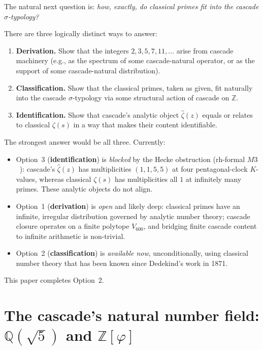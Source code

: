 \documentclass[11pt,a4paper]{article}
\theoremstyle{definition}
\theoremstyle{remark}
\begin{document}
The natural next question is: \emph{how, exactly, do classical primes
fit into the cascade $\sigma$-typology?}

There are three logically distinct ways to answer:

\begin{enumerate}\itemsep0pt
  \item \textbf{Derivation.} Show that the integers $2, 3, 5, 7, 11, \ldots$
    arise from cascade machinery (e.g., as the spectrum of some
    cascade-natural operator, or as the support of some
    cascade-natural distribution).
  \item \textbf{Classification.} Show that the classical primes, taken
    as given, fit naturally into the cascade $\sigma$-typology via some
    structural action of cascade on $\mathbb{Z}$.
  \item \textbf{Identification.} Show that cascade's analytic object
    $\hat{\zeta}(z)$ equals or relates to classical $\zeta(s)$ in a way
    that makes their content identifiable.
\end{enumerate}

The strongest answer would be all three. Currently:

\begin{itemize}\itemsep0pt
  \item Option~3 (\textbf{identification}) is \emph{blocked} by the
    Hecke obstruction (rh-formal $M3$~\cite{rhFormalSmart}): cascade's
    $\hat{\zeta}(z)$ has multiplicities $(1, 1, 5, 5)$ at four
    pentagonal-clock $K$-values, whereas classical $\zeta(s)$ has
    multiplicities all $1$ at infinitely many primes. These analytic
    objects do not align.
  \item Option~1 (\textbf{derivation}) is \emph{open} and likely deep:
    classical primes have an infinite, irregular distribution
    governed by analytic number theory; cascade closure operates on a
    finite polytope $V_{600}$, and bridging finite cascade content to
    infinite arithmetic is non-trivial.
  \item Option~2 (\textbf{classification}) is \emph{available now},
    unconditionally, using classical number theory that has been known
    since Dedekind's work in 1871.
\end{itemize}

This paper completes Option~2.

\section{The cascade's natural number field: $\mathbb{Q}(\sqrt{5})$ and $\mathbb{Z}[\varphi]$}\label{sec:Q_sqrt5}
\end{document}
